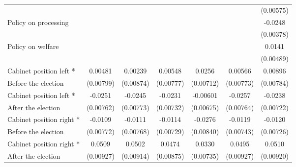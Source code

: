 \begin{table}[!ht]
\begin{tabular}{l*{6}{c}}
                    &                     &                     &                     &                     &                     &   (0.00575)         \\
[0,5em]
Policy on processing&                     &                     &                     &                     &                     &     -0.0248\sym{***}\\
                    &                     &                     &                     &                     &                     &   (0.00378)         \\
[0,5em]
Policy on welfare   &                     &                     &                     &                     &                     &      0.0141\sym{**} \\
                    &                     &                     &                     &                     &                     &   (0.00489)         \\
[0,5em]
Cabinet position left * &     0.00481         &     0.00239         &     0.00548         &      0.0256\sym{***}&     0.00566         &     0.00896         \\
Before the election                    &   (0.00799)         &   (0.00874)         &   (0.00777)         &   (0.00712)         &   (0.00773)         &   (0.00784)         \\
[0,5em]
Cabinet position left * &     -0.0251\sym{**} &     -0.0245\sym{**} &     -0.0231\sym{**} &    -0.00601         &     -0.0257\sym{**} &     -0.0238\sym{**} \\
After the election                    &   (0.00762)         &   (0.00773)         &   (0.00732)         &   (0.00675)         &   (0.00764)         &   (0.00722)         \\
[0,5em]
Cabinet position right * &     -0.0109         &     -0.0111         &     -0.0114         &     -0.0276\sym{**} &     -0.0119         &     -0.0120         \\
Before the election                    &   (0.00772)         &   (0.00768)         &   (0.00729)         &   (0.00840)         &   (0.00743)         &   (0.00726)         \\
[0,5em]
Cabinet position right * &      0.0509\sym{***}&      0.0502\sym{***}&      0.0474\sym{***}&      0.0330\sym{***}&      0.0495\sym{***}&      0.0510\sym{***}\\
After the election                    &   (0.00927)         &   (0.00914)         &   (0.00875)         &   (0.00735)         &   (0.00927)         &   (0.00920)         \\

\end{tabular}
\end{table}
